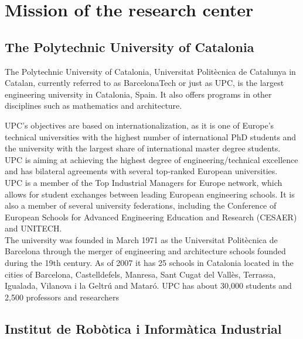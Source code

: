 
\chapter{Mission of the research center}
\label{context}


\newcommand{\keyword}[1]{\textbf{#1}}
\newcommand{\tabhead}[1]{\textbf{#1}}
\newcommand{\code}[1]{\texttt{#1}}
\newcommand{\file}[1]{\texttt{\bfseries#1}}
\newcommand{\option}[1]{\texttt{\itshape#1}}


\section{The Polytechnic University of Catalonia}

The Polytechnic University of Catalonia, Universitat Politècnica de Catalunya in Catalan, currently referred to as BarcelonaTech or just as UPC, is the largest engineering university in Catalonia, Spain.
It also offers programs in other disciplines such as mathematics and architecture.

UPC's objectives are based on internationalization, as it is one of Europe's technical universities with the highest number of international PhD students and the university with the largest share of international master degree students.
UPC is aiming at achieving the highest degree of engineering/technical excellence and has bilateral agreements with several top-ranked European universities.\\


UPC is a member of the Top Industrial Managers for Europe network, which allows for student exchanges between leading European engineering schools.
It is also a member of several university federations, including the Conference of European Schools for Advanced Engineering Education and Research (CESAER) and UNITECH.\\

The university was founded in March 1971 as the Universitat Politècnica de Barcelona through the merger of engineering and architecture schools founded during the 19th century.
As of 2007 it has 25 schools in Catalonia located in the cities of Barcelona, Castelldefels, Manresa, Sant Cugat del Vallès, Terrassa, Igualada, Vilanova i la Geltrú and Mataró.
UPC has about 30,000 students and 2,500 professors and researchers

\section{Institut de Robòtica i Informàtica Industrial}



